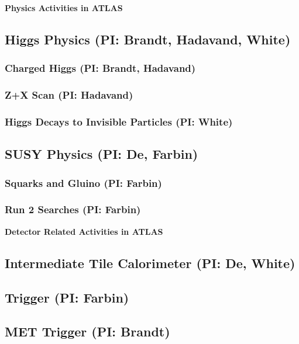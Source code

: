 \documentclass[11pt]{article}
\def\twohead#1{\subsection{#1}}
\def\threehead#1{\subsubsection{#1}}
\def\centerhead#1{
	\begin{center}
	\Large\textbf{#1}
	\end{center}}
\begin{document}




\centerhead{Physics Activities in ATLAS}

\twohead{Higgs Physics (PI: Brandt, Hadavand, White)}



\threehead{Charged Higgs (PI: Brandt, Hadavand)}


\threehead{Z+X Scan (PI: Hadavand)}


\threehead{Higgs Decays to Invisible Particles (PI: White)}


\twohead{SUSY Physics (PI: De, Farbin)}



\threehead{Squarks and Gluino (PI: Farbin)}

\threehead{Run 2 Searches (PI: Farbin)}



\centerhead{Detector Related Activities in ATLAS}

\twohead{Intermediate Tile Calorimeter (PI: De, White)}


\twohead{Trigger (PI: Farbin)}


\twohead{MET Trigger (PI: Brandt)}

\end{document}
